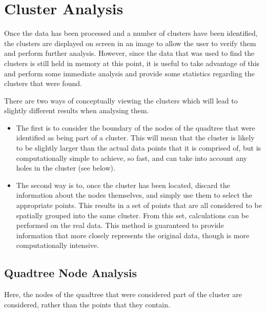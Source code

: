 
\section{Cluster Analysis}
\label{sec:cluster_analysis}

Once the data has been processed and a number of clusters have been identified,
the clusters are displayed on screen in an image to allow the user to verify
them and perform further analysis. However, since the data that was used to
find the clusters is still held in memory at this point, it is useful to take
advantage of this and perform some immediate analysis and provide some
statistics regarding the clusters that were found.

There are two ways of conceptually viewing the clusters which will lead to
slightly different results when analysing them.

\begin{itemize}

	\item The first is to consider the boundary of the nodes of the quadtree
		that were identified as being part of a cluster. This will mean that
		the cluster is likely to be slightly larger than the actual data points
		that it is comprised of, but is computationally simple to achieve, so
		fast, and can take into account any holes in the cluster (see below).

	\item The second way is to, once the cluster has been located, discard the
		information about the nodes themselves, and simply use them to select
		the appropriate points. This results in a set of points that are all
		considered to be spatially grouped into the same cluster. From this
		set, calculations can be performed on the real data. This method is
		guaranteed to provide information that more closely represents the
		original data, though is more computationally intensive.

\end{itemize}

\subsection{Quadtree Node Analysis}
\label{sub:quadtree_node_analysis}

Here, the nodes of the quadtree that were considered part of the cluster are
considered, rather than the points that they contain.

